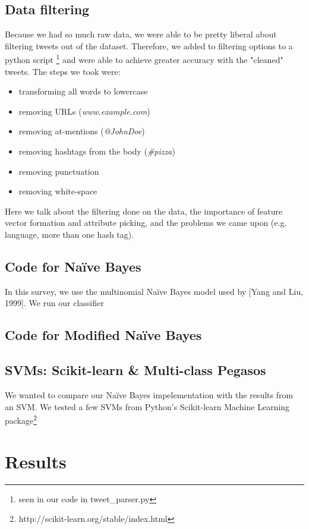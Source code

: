 \documentclass[11pt,letterpaper]{article}
\begin{document}
\subsection{Data filtering}
Because we had so much raw data, we were able to be pretty liberal about filtering tweets out of the dataset. Therefore, we added to filtering options to a python script \footnote{seen in our code in tweet\_parser.py} and were able to achieve greater accuracy with the "cleaned" tweets. The steps we took were:
\begin{itemize}
\item transforming all words to lowercase
\item removing URLs (\textit{www.example.com})
\item removing at-mentions (\textit{@JohnDoe})
\item removing hashtags from the body (\textit{\#pizza})
\item removing punctuation
\item removing white-space
\end{itemize}

Here we talk about the filtering done on the data, the importance of feature vector formation and attribute picking, and the problems we came upon (e.g. language, more than one hash tag).

\subsection{Code for Na{\"i}ve Bayes}
  In this survey, we use the multinomial Na{\"i}ve Bayes model used by [Yang and Liu, 1999]. We run our classifier 

\subsection{Code for Modified Na{\"i}ve Bayes}

\subsection{SVMs: Scikit-learn \& Multi-class Pegasos}
We wanted to compare our Na{\"i}ve Bayes impelementation with the results from an SVM. We tested a few SVMs from Python's Scikit-learn Machine Learning package\footnote{http://scikit-learn.org/stable/index.html} 

\section{Results}
\end{document}
